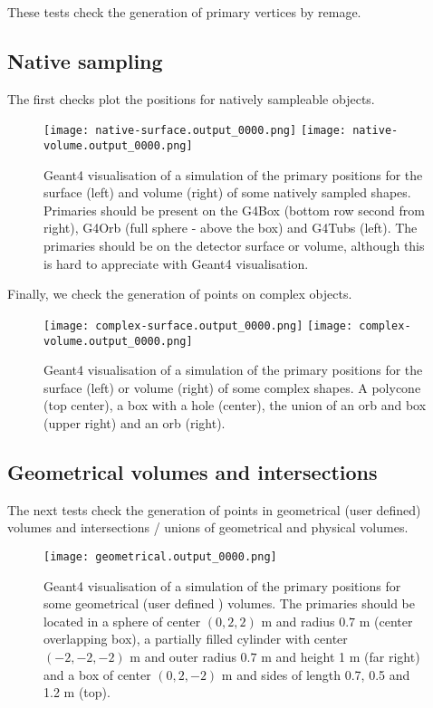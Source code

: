 
These tests check the generation of primary vertices by remage.
\subsection{Native sampling}
The first checks plot the positions for natively sampleable objects.



\begin{figure}[h!]
    \centering
    \texttt{[image: native-surface.output\_0000.png]}
    \texttt{[image: native-volume.output\_0000.png]}
    \caption{Geant4 visualisation of a simulation of the primary positions for the surface (left) and volume (right) of
    some natively sampled shapes. Primaries should be present on the G4Box (bottom row second from right),
    G4Orb (full sphere - above the box) and G4Tubs (left). The primaries should be on the detector surface or volume, although this
    is hard to appreciate with Geant4 visualisation.
    }
\end{figure}


Finally, we check the generation of points on complex objects.
\begin{figure}[h!]
    \centering
    \texttt{[image: complex-surface.output\_0000.png]}
    \texttt{[image: complex-volume.output\_0000.png]}

    \caption{Geant4 visualisation of a simulation of the primary positions for the surface (left) or volume (right) of
    some complex shapes. A polycone (top center), a box with a hole (center), the union of an orb and box (upper right)
    and an orb (right).
    }
\end{figure}



\subsection{Geometrical volumes and intersections}
The next tests check the generation of points in geometrical (user defined) volumes and intersections / unions of
geometrical and physical volumes.

\begin{figure}[h!]
    \centering
    \texttt{[image: geometrical.output\_0000.png]}
    \caption{Geant4 visualisation of a simulation of the primary positions for some geometrical (user defined ) volumes.
    The primaries should be located in a sphere of center $(0,2,2)$ m and radius $0.7$ m (center overlapping box), a partially filled cylinder with center
    $(-2,-2,-2)$ m and outer radius $0.7$ m and height 1 m (far right) and a box of center $(0,2,-2)$ m and sides of length 0.7, 0.5 and 1.2 m (top).
    }
\end{figure}


